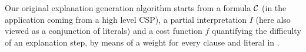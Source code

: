 Our original explanation generation algorithm \cite{ecai/BogaertsGCG20} starts from a formula $\mathcal{C} $ (in the application coming from a high level CSP), a partial interpretation $I$ (here also viewed as a conjunction of literals) and a cost function $f$ quantifying the difficulty of an explanation step, by means of a weight for every clause and literal in \formula. %


